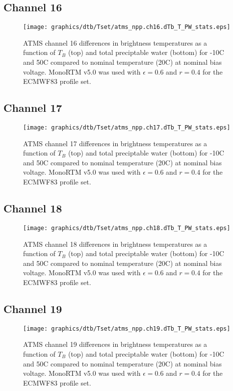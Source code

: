 \subsection{Channel 16}
\begin{figure}[H]
  \label{fig:Tset.ch16_dtb}
  \centering
  \hspace{1.5cm}\texttt{[image: graphics/dtb/Tset/atms\_npp.ch16.dTb\_T\_PW\_stats.eps]}
  \caption{ATMS channel 16 differences in brightness temperatures as a function of $T_B$ (top) and total preciptable water (bottom) for -10\textdegree{}C and 50\textdegree{}C compared to nominal temperature (20\textdegree{}C) at nominal bias voltage. MonoRTM v5.0 was used with $\epsilon=0.6$ and $r=0.4$ for the ECMWF83 profile set.}
\end{figure}

\subsection{Channel 17}
\begin{figure}[H]
  \label{fig:Tset.ch17_dtb}
  \centering
  \hspace{1.5cm}\texttt{[image: graphics/dtb/Tset/atms\_npp.ch17.dTb\_T\_PW\_stats.eps]}
  \caption{ATMS channel 17 differences in brightness temperatures as a function of $T_B$ (top) and total preciptable water (bottom) for -10\textdegree{}C and 50\textdegree{}C compared to nominal temperature (20\textdegree{}C) at nominal bias voltage. MonoRTM v5.0 was used with $\epsilon=0.6$ and $r=0.4$ for the ECMWF83 profile set.}
\end{figure}

\subsection{Channel 18}
\begin{figure}[H]
  \label{fig:Tset.ch18_dtb}
  \centering
  \hspace{1.5cm}\texttt{[image: graphics/dtb/Tset/atms\_npp.ch18.dTb\_T\_PW\_stats.eps]}
  \caption{ATMS channel 18 differences in brightness temperatures as a function of $T_B$ (top) and total preciptable water (bottom) for -10\textdegree{}C and 50\textdegree{}C compared to nominal temperature (20\textdegree{}C) at nominal bias voltage. MonoRTM v5.0 was used with $\epsilon=0.6$ and $r=0.4$ for the ECMWF83 profile set.}
\end{figure}

\subsection{Channel 19}
\begin{figure}[H]
  \label{fig:Tset.ch19_dtb}
  \centering
  \hspace{1.5cm}\texttt{[image: graphics/dtb/Tset/atms\_npp.ch19.dTb\_T\_PW\_stats.eps]}
  \caption{ATMS channel 19 differences in brightness temperatures as a function of $T_B$ (top) and total preciptable water (bottom) for -10\textdegree{}C and 50\textdegree{}C compared to nominal temperature (20\textdegree{}C) at nominal bias voltage. MonoRTM v5.0 was used with $\epsilon=0.6$ and $r=0.4$ for the ECMWF83 profile set.}
\end{figure}

